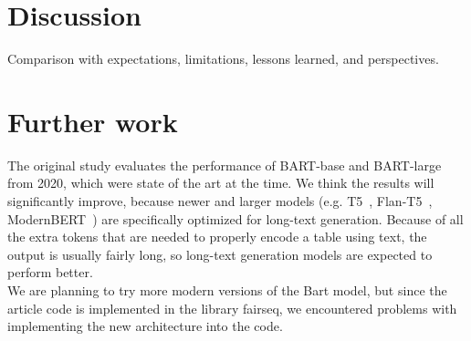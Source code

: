 \documentclass[12pt,a4paper]{article}
\begin{document}
\section*{Discussion}

Comparison with expectations, limitations, lessons learned, and perspectives.

\section*{Further work}
The original study evaluates the performance of BART-base and BART-large~\cite{lewis2019bart} from 2020, which were state of the art at the time.  We think the results will significantly improve, because newer and larger models (e.g. T5~\cite{raffel2020exploring}, Flan-T5~\cite{chung2024scaling}, ModernBERT~\cite{warner2024smarter}) are specifically optimized for long-text generation. Because of all the extra tokens that are needed to properly encode a table using text, the output is usually fairly long, so long-text generation models are expected to perform better.
\ \\

We are planning to try more modern versions of the Bart model, but since the article code is implemented in the library fairseq, we encountered problems with implementing the new architecture into the code.




\end{document}
